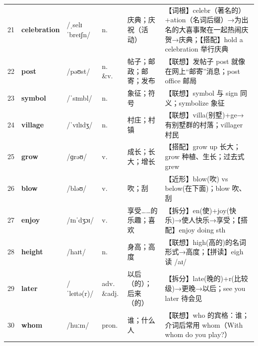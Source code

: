 \documentclass[UTF8,a4paper,11pt,oneside]{ctexbook}
\newcommand{\cellword}[1]{{\bfseries\textcolor{wordcol}{#1}}}
\newcommand{\cellipa}[1]{{\footnotesize\textcolor{ipacol}{#1}}}
\newcommand{\cellpos}[1]{\textcolor{poscol}{#1}}
\newcommand{\cellno}[1]{\textcolor{volcolor!75!black}{#1}}
\begin{document}
{\begin{longtable}{@{}C{0.045\textwidth}L{0.155\textwidth}L{0.175\textwidth}C{0.070\textwidth}L{0.180\textwidth}L{0.282\textwidth}@{}}
 \cellno{21} & \cellword{celebration} & \cellipa{/ˌselɪˈbreɪʃn/} & \cellpos{n.} & 庆典；庆祝（活动） & \textcolor{tagRoot}{【词根】}celebr（著名的）+ation（名词后缀）→\allowbreak{}为出名的大喜事聚在一起热闹庆贺→\allowbreak{}庆典；\textcolor{tagColloc}{【搭配】}hold a celebration 举行庆典 \\
\cellno{22} & \cellword{post} & \cellipa{/pəʊst/} & \cellpos{n. \&v.} & 帖子；邮政；邮寄；发布 & \textcolor{tagAssoc}{【联想】}发帖子 post 就像在网上“邮寄”消息；post office 邮局 \\
 \cellno{23} & \cellword{symbol} & \cellipa{/ˈsɪmbl/} & \cellpos{n.} & 象征；符号 & \textcolor{tagAssoc}{【联想】}symbol 与 sign 同义；symbolize 象征 \\
\cellno{24} & \cellword{village} & \cellipa{/ˈvɪlɪdʒ/} & \cellpos{n.} & 村庄；村镇 & \textcolor{tagAssoc}{【联想】}villa(别墅)+ge→\allowbreak{}有别墅群的村落；villager 村民 \\
 \cellno{25} & \cellword{grow} & \cellipa{/ɡrəʊ/} & \cellpos{v.} & 成长；长大；增长 & \textcolor{tagColloc}{【搭配】}grow up 长大；grow 种植、生长；过去式 grew \\
\cellno{26} & \cellword{blow} & \cellipa{/bləʊ/} & \cellpos{v.} & 吹；刮 & \textcolor{tagNear}{【近形】}blow(吹) vs below(在下面)；blow 吹、刮 \\
 \cellno{27} & \cellword{enjoy} & \cellipa{/ɪnˈdʒɔɪ/} & \cellpos{v.} & 享受……的乐趣；喜欢 & \textcolor{tagSplit}{【拆分】}en(使)+joy(快乐)→\allowbreak{}使人快乐→\allowbreak{}享受；\textcolor{tagColloc}{【搭配】}enjoy doing sth \\
\cellno{28} & \cellword{height} & \cellipa{/haɪt/} & \cellpos{n.} & 身高；高度 & \textcolor{tagAssoc}{【联想】}high(高的)的名词形式→\allowbreak{}高度；\textcolor{tagSpell}{【拼读】}eigh 读 /aɪ/ \\
 \cellno{29} & \cellword{later} & \cellipa{/ˈleɪtə(r)/} & \cellpos{adv. \&adj.} & 以后（的）；后来（的） & \textcolor{tagSplit}{【拆分】}late(晚的)+r(比较级)→\allowbreak{}更晚→\allowbreak{}以后；see you later 待会见 \\
\cellno{30} & \cellword{whom} & \cellipa{/huːm/} & \cellpos{pron.} & 谁；什么人 & \textcolor{tagAssoc}{【联想】}who 的宾格：谁；介词后常用 whom（With whom do you play?） \\
\end{longtable}
}

\end{document}
